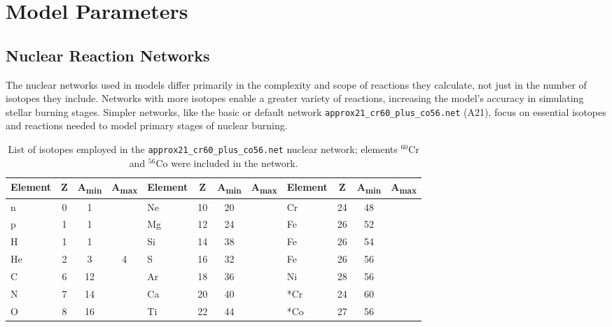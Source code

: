 \section{Model Parameters}
\subsection{Nuclear Reaction Networks}
The nuclear networks used in models differ primarily in the complexity and scope of reactions they calculate, not just in the number of isotopes they include. Networks with more isotopes enable a greater variety of reactions, increasing the model’s accuracy in simulating stellar burning stages. Simpler networks, like the basic or default network \texttt{approx21\_cr60\_plus\_co56.net} (A21), focus on essential isotopes and reactions needed to model primary stages of nuclear burning. 
\begin{table}[h!]
    \centering
    \begin{tabular}{>{\raggedright\arraybackslash}p{1.5cm} c c c | >{\raggedright\arraybackslash}p{1.5cm} c c c | >{\raggedright\arraybackslash}p{1.5cm} c c c}
        \hline\hline
        \textbf{Element} & \textbf{Z} & \textbf{A\textsubscript{min}} & \textbf{A\textsubscript{max}} & \textbf{Element} & \textbf{Z} & \textbf{A\textsubscript{min}} & \textbf{A\textsubscript{max}} & \textbf{Element} & \textbf{Z} & \textbf{A\textsubscript{min}} & \textbf{A\textsubscript{max}} \\
        \hline
        n & 0 & 1 & & Ne & 10 & 20 & &Cr & 24 & 48 &  \\
        p & 1 & 1 & & Mg & 12 & 24 &  &  Fe & 26 & 52 &  \\
        H & 1 & 1 &  & Si & 14 & 38 &  &Fe & 26 & 54 &  \\
        He & 2 & 3 & 4 & S & 16 & 32 &  &Fe & 26 & 56 &  \\
        C & 6 & 12 &  & Ar & 18 & 36 & &  Ni & 28 & 56 & \\
        N & 7 & 14 &  & Ca & 20 & 40 &  & *Cr & 24 & 60  &  \\
        O & 8 & 16 &  & Ti & 22 & 44 &  & *Co & 27 & 56 &  \\
        \hline
    \end{tabular}
    \caption{List of isotopes employed in the \texttt{approx21\_cr60\_plus\_co56.net} nuclear network; elements $^{60}$Cr and $^{56}$Co were included in the network.}
    \label{tab:a21}
\end{table}

